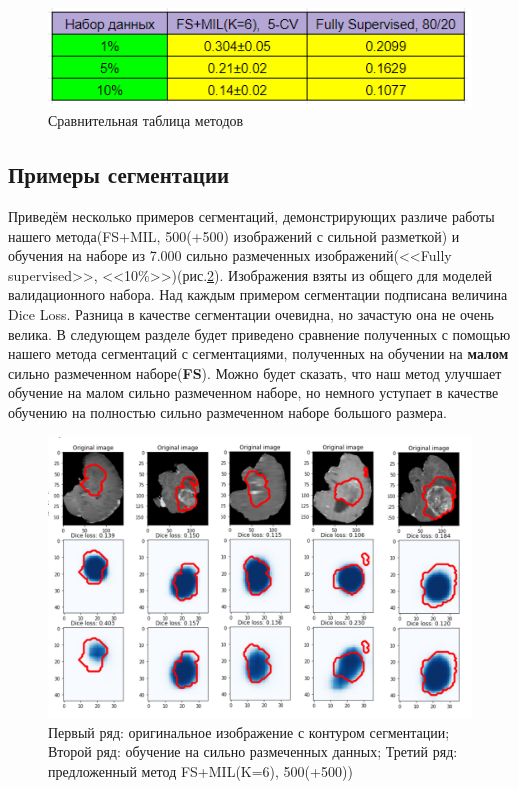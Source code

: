 \begin{figure}[h!] 
  \center
  \includegraphics [scale=1.0] {images/compare_with_fs.png}
  \caption{Сравнительная таблица методов}
  \label{fig:cmp_with_fs}  
\end{figure}
\newpage
\subsection{Примеры сегментации}

Приведём несколько примеров сегментаций, демонстрирующих различе работы нашего метода(FS+MIL, 500(+500) изображений с сильной разметкой) и обучения на наборе из 7.000 сильно размеченных изображений(<<Fully supervised>>, <<10\%>>)(рис.\ref{fig:cmp_fs_ours}).   Изображения взяты из общего для моделей валидационного набора. Над каждым примером сегментации подписана величина Dice Loss. Разница в качестве сегментации очевидна, но зачастую она не очень велика. В следующем разделе будет приведено сравнение полученных с помощью нашего метода сегментаций с сегментациями, полученных на обучении на {\bf малом} сильно размеченном наборе({\bf FS}). Можно будет сказать, что наш метод улучшает обучение на малом сильно размеченном наборе, но немного уступает в качестве обучению на полностью сильно размеченном наборе большого размера. 

\begin{figure}[h!] 
  \center
  \includegraphics [scale=0.5] {images/cmp_fs_ours.png}
  \caption{Первый ряд: оригинальное изображение с контуром сегментации; Второй ряд: обучение на сильно размеченных данных; Третий ряд: предложенный метод FS+MIL(K=6), 500(+500))}
  \label{fig:cmp_fs_ours}  
\end{figure}




